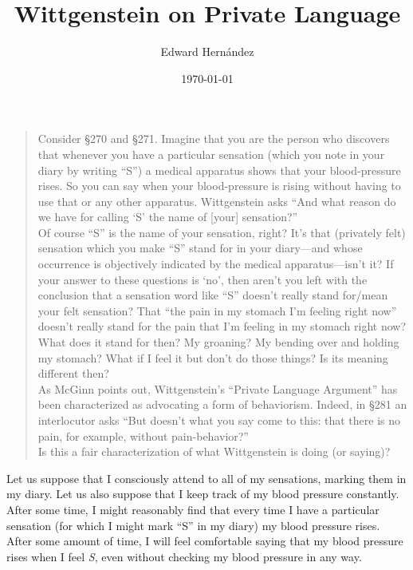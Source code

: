 \documentclass[doc,12pt,apacite,biblatex]{apa6}
\begin{document}
\title{Wittgenstein on Private Language}
\author{Edward Hern\'{a}ndez}
\date{\today}

\maketitle

\vspace{-10pt}
\begin{quote}
	Consider \S 270 and \S 271.  Imagine that you are the person who discovers
	that whenever you have a particular sensation (which you note in your diary
	by writing ``S'') a medical apparatus shows that your blood-pressure rises.
	So you can say when your blood-pressure is rising without having to use
	that or any other apparatus. Wittgenstein asks ``And what reason do we have
	for calling `S' the name of [your] sensation?'' \\
	Of course ``S'' is the name of your sensation, right?  It's that (privately
	felt) sensation which you make ``S'' stand for in your diary---and whose
	occurrence is objectively indicated by the medical apparatus---isn't it?
	If your answer to these questions is `no', then aren't you left with the
	conclusion that a sensation word like ``S'' doesn't really stand for/mean
	your felt sensation?  That ``the pain in my stomach I'm feeling right now''
	doesn't really stand for the pain that I'm feeling in my stomach right now?
	What does it stand for then?  My groaning?  My bending over and holding my
	stomach?  What if I feel it but don't do those things?  Is its meaning
	different then? \\
	As McGinn points out, Wittgenstein's ``Private Language Argument'' has been
	characterized as advocating a form of behaviorism.  Indeed, in \S 281 an
	interlocutor asks ``But doesn't what you say come to this: that there is no
	pain, for example, without pain-behavior?'' \\ 
	Is this a fair characterization of what Wittgenstein is doing (or saying)?
\end{quote}
\clearpage

Let us suppose that I consciously attend to all of my sensations, marking them
in my diary. Let us also suppose that I keep track of my blood pressure
constantly. After some time, I might reasonably find that every time I have a
particular sensation (for which I might mark ``S'' in my diary) my blood
pressure rises.  After some amount of time, I will feel comfortable saying that
my blood pressure rises when I feel \textit{S}, even without checking my blood
pressure in any way.
\end{document}
